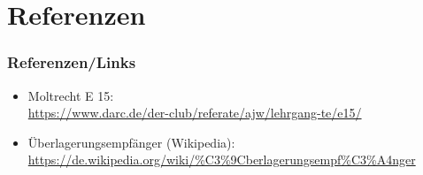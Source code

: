 \section*{Referenzen}

\begin{frame}
  \frametitle{Referenzen/Links}

  \footnotesize
  \begin{itemize}
    \item Moltrecht E 15: \\
      \url{https://www.darc.de/der-club/referate/ajw/lehrgang-te/e15/}
    \item Überlagerungsempfänger (Wikipedia): \\
      \url{https://de.wikipedia.org/wiki/\%C3\%9Cberlagerungsempf\%C3\%A4nger}
  \end{itemize}

\end{frame}


